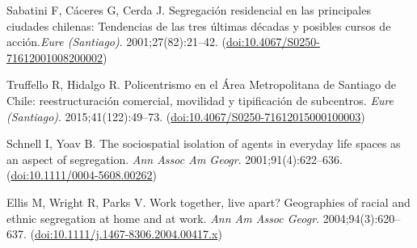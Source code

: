 \documentclass[%
preprint,
 amsmath,amssymb,
pra,
]{revtex4-1}
\begin{document}
\begin{thebibliography}{10}
Sabatini F, C{\'a}ceres G, Cerda J. Segregaci{\'o}n residencial en las principales ciudades chilenas: Tendencias de las tres {\'u}ltimas d{\'e}cadas y posibles cursos de acci{\'o}n.\emph{Eure (Santiago)}. 2001;27(82):21--42. (\href{https://dx.doi.org/10.4067/S0250-71612001008200002 }{doi:10.4067/S0250-71612001008200002})

Truffello R, Hidalgo R. Policentrismo en el {\'A}rea Metropolitana de Santiago de Chile: reestructuraci{\'o}n comercial, movilidad y tipificaci{\'o}n de subcentros. \emph{Eure (Santiago)}. 2015;41(122):49--73. (\href{https://dx.doi.org/10.4067/S0250-71612015000100003}{doi:10.4067/S0250-71612015000100003})

Schnell I, Yoav B. The sociospatial isolation of agents in everyday life spaces as an aspect of segregation. \emph{Ann Assoc Am Geogr}. 2001;91(4):622--636. (\href{https://dx.doi.org/10.1111/0004-5608.00262}{doi:10.1111/0004-5608.00262})

Ellis M, Wright R, Parks V. Work together, live apart? Geographies of racial and ethnic segregation at home and at work. \emph{Ann Am Assoc Geogr}. 2004;94(3):620--637. (\href{https://dx.doi.org/10.1111/j.1467-8306.2004.00417.x}{doi:10.1111/j.1467-8306.2004.00417.x})

\end{thebibliography}
\end{document}
